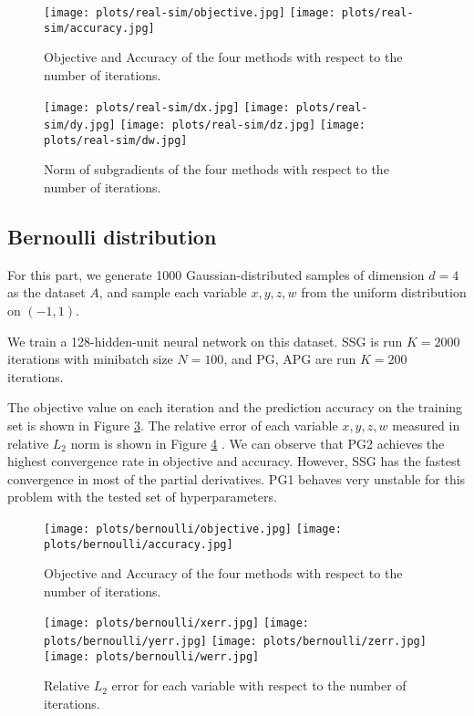 \documentclass{article}
\numberwithin{equation}{section}
\numberwithin{figure}{section}
\begin{document}
\begin{figure}[h]
\centering
\vbox{
	\texttt{[image: plots/real-sim/objective.jpg]}
	\texttt{[image: plots/real-sim/accuracy.jpg]}
}
\caption{Objective and Accuracy of the four methods with respect to the number of iterations.}
\label{real-sim-obj-acc}
\end{figure}

\begin{figure}[h]
\centering
\vbox{
	\texttt{[image: plots/real-sim/dx.jpg]}
	\texttt{[image: plots/real-sim/dy.jpg]}
	\texttt{[image: plots/real-sim/dz.jpg]}
	\texttt{[image: plots/real-sim/dw.jpg]}
}
\caption{Norm of subgradients of the four methods with respect to the number of iterations.}
\label{real-sim-subgradient}
\end{figure}

\subsection{Bernoulli distribution}
For this part, we generate 1000 Gaussian-distributed samples of dimension $d=4$ as the dataset $A$, and sample each variable $x, y, z, w$ from the uniform distribution on $(-1, 1)$. 

We train a 128-hidden-unit neural network on this dataset. SSG is run $K=2000$ iterations with minibatch size $N = 100$, and PG, APG are run $K = 200$ iterations. 

The objective value on each iteration and the prediction accuracy on the training set is shown in Figure \ref{bernoulli-obj-acc}. The relative error of each variable $x, y, z, w$ measured in relative $L_2 $ norm is shown in Figure \ref{bernoulli-error} . We can observe that PG2 achieves the highest convergence rate in objective and accuracy. However, SSG has the fastest convergence in most of the partial derivatives. PG1 behaves very unstable for this problem with the tested set of hyperparameters.



\begin{figure}[ht]
\centering
\vbox{
	\texttt{[image: plots/bernoulli/objective.jpg]}
	\texttt{[image: plots/bernoulli/accuracy.jpg]}
}
\caption{Objective and Accuracy of the four methods with respect to the number of iterations.}
\label{bernoulli-obj-acc}
\end{figure}

\begin{figure}[h]
\centering
\vbox{
	\texttt{[image: plots/bernoulli/xerr.jpg]}
	\texttt{[image: plots/bernoulli/yerr.jpg]}
	\texttt{[image: plots/bernoulli/zerr.jpg]}
	\texttt{[image: plots/bernoulli/werr.jpg]}
}
\caption{Relative $L_2 $ error for each variable with respect to the number of iterations.}
\label{bernoulli-error}
\end{figure}
\end{document}
